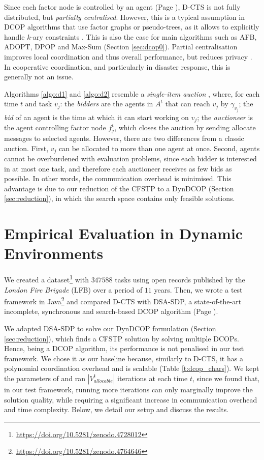 Since each factor node is controlled by an agent (Page \pageref{fgas}), D-CTS is not fully
distributed, but \emph{partially centralised}. However, this is a typical assumption in
DCOP algorithms that use factor graphs or pseudo-trees, as it allows to explicitly handle
$k$-ary constraints \cite[Section $4.2$]{fioretto2018survey}. This is also the case for
main algorithms such as AFB, ADOPT, DPOP and Max-Sum (Section \ref{sec:dcop0}).
Partial centralisation improves local coordination and thus overall performance, but
reduces privacy \cite[Section $4.3.1$]{fioretto2018survey}.
In cooperative coordination, and particularly in disaster response, this is generally not
an issue.

Algorithms \ref{algo:d1} and \ref{algo:d2} resemble a \emph{single-item auction}
\cite{dias2006}, where, for each time $t$ and task $v_j$: the \emph{bidders} are the
agents in $A^t$ that can reach $v_j$ by $\gamma_{v_j}$; the \emph{bid} of an agent is the
time at which it can start working on $v_j$; the \emph{auctioneer} is the agent
controlling factor node $f^t_j$, which closes the auction by sending \textsf{allocate}
messages to selected agents.
However, there are two differences from a classic auction. First, $v_j$ can be
allocated to more than one agent at once.
Second, agents cannot be overburdened with evaluation problems, since each bidder is
interested in at most one task, and therefore each auctioneer receives as few bids as
possible. In other words, the communication overhead is minimised.
This advantage is due to our reduction of the CFSTP to a DynDCOP (Section
\ref{sec:reduction}), in which the search space contains only feasible solutions.

\section{Empirical Evaluation in Dynamic Environments}\label{sec:dcts-tests}

We created a dataset\footnote{\url{https://doi.org/10.5281/zenodo.4728012}} with $347588$
tasks using open records published by the \emph{London Fire Brigade} (LFB) over a period
of $11$ years. Then, we wrote a test framework in
Java\footnote{\url{https://doi.org/10.5281/zenodo.4764646}} and compared D-CTS with
DSA-SDP, a state-of-the-art incomplete, synchronous and search-based DCOP algorithm
(Page \pageref{sec:dsa}).

We adapted DSA-SDP to solve our DynDCOP formulation (Section \ref{sec:reduction}), which
finds a CFSTP solution by solving multiple DCOPs. Hence, being a DCOP algorithm, its
performance is not penalised in our test framework. We chose it as our baseline because,
similarly to D-CTS, it has a polynomial coordination overhead and is scalable (Table
\ref{t:dcop_chars}). We kept the parameters of \cite{zivan2014} and ran
$|V^t_{allocable}|$ iterations at each time $t$, since we found that, in our test
framework, running more iterations can only marginally improve the solution quality, while
requiring a significant increase in communication overhead and time complexity. Below, we
detail our setup and discuss the results.

